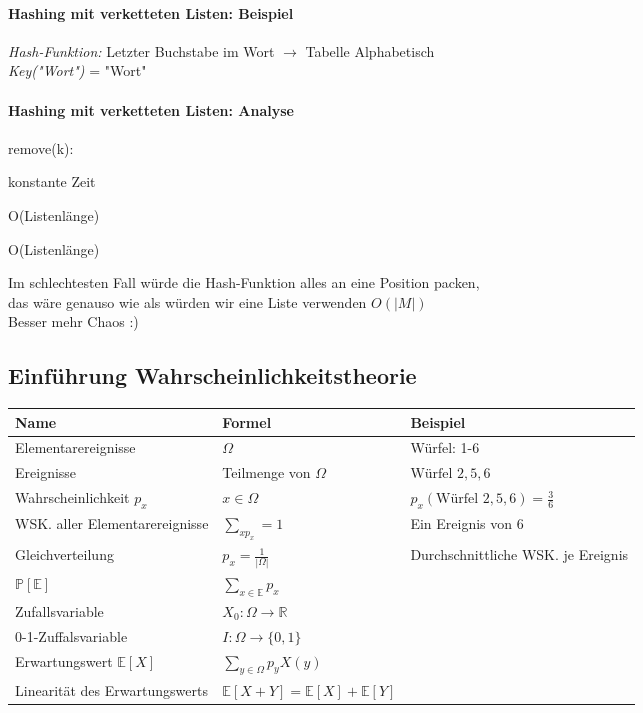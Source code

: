 \documentclass[a4paper]{scrartcl}
\begin{document}
	\paragraph{Hashing mit verketteten Listen: Beispiel}
	\emph{Hash-Funktion: }Letzter Buchstabe im Wort \( \rightarrow \) Tabelle Alphabetisch\\
	\emph{Key("Wort")} = "Wort"\\
	
	\paragraph{Hashing mit verketteten Listen: Analyse}
	\begin{labeling}{remove(k):}
		\item[\emph{insert(e):}] konstante Zeit 
		\item[\emph{remove(k):}] O(Listenlänge)
		\item[\emph{find(k):}] O(Listenlänge)
	\end{labeling}
	Im schlechtesten Fall würde die Hash-Funktion alles an eine Position packen, \\
	das wäre genauso wie als würden wir eine Liste verwenden \(O(|M|)\)\\
	Besser mehr Chaos :)\\
	 
	\subsection{Einführung Wahrscheinlichkeitstheorie} 
	\begin{table}[H]
		\centering
		\begin{tabular}{|l|l|l|}
			\hline
			Name & Formel & Beispiel \\
			\hline
			Elementarereignisse & \( \Omega \)  & Würfel: 1-6 \\
			Ereignisse& Teilmenge von \( \Omega \) & \(\text{Würfel } 2,5,6\)  \\
			Wahrscheinlichkeit \(p_x\) & \( x \in \Omega  \)& \( p_x(\text{Würfel } 2,5,6) = \frac{3}{6} \)   \\
			WSK. aller Elementarereignisse & \( \sum_{x p_x } = 1\) & Ein Ereignis von 6\\
			Gleichverteilung& \( p_x = \frac{1}{|\Omega|} \) & Durchschnittliche WSK. je Ereignis  \\
			\( \mathbb{P} [\mathbb{E}]\)& \( \sum_{x \in \mathbb{E}} p_x \) &\\
			Zufallsvariable & \(X_0 : \Omega \rightarrow \mathbb{ R } \)&\\
			0-1-Zuffalsvariable & \( I : \Omega \rightarrow \{ 0 ,1 \} \) &\\
			Erwartungswert \( \mathbb{ E } [X] \)& \( \sum_{y \in \Omega } p_y X(y) \) &\\
			Linearität des Erwartungswerts& \(\mathbb{E} [X + Y] = \mathbb{E} [X] + \mathbb{E}[Y]\) &\\ \hline
		\end{tabular}
	\end{table}
	
\end{document}
